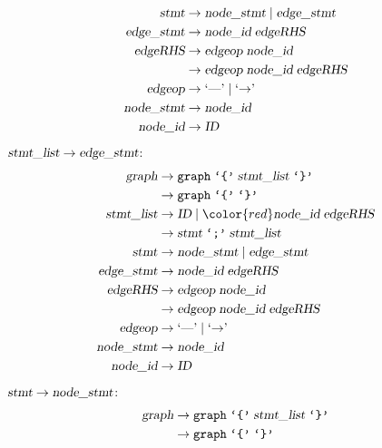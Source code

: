 \begin{loesung}
\begin{teilaufgaben}
\begin{align*}
\textsl{stmt}      &\rightarrow \textsl{node\_stmt}\; |\;
                                \textsl{edge\_stmt} \\
\textsl{edge\_stmt}&\rightarrow \textsl{node\_id}\; \textsl{edgeRHS} \\
\textsl{edgeRHS}   &\rightarrow \textsl{edgeop}\; \textsl{node\_id}\\
                   &\rightarrow \textsl{edgeop}\; \textsl{node\_id}\; \textsl{edgeRHS}\\
\textsl{edgeop}    &\rightarrow \textrm{`\text{---}'}\; |\; \textrm{`$\rightarrow$'}\; \\
\textsl{node\_stmt}&\rightarrow \textsl{node\_id} \\
\textsl{node\_id}  &\rightarrow \textsl{ID}
\end{align*}
$\textsl{stmt\_list}\to\textsl{edge\_stmt}$:
\begin{align*}
\textsl{graph}     &\rightarrow \texttt{graph}\; \texttt{`\{'}\; \textsl{stmt\_list}\; \texttt{`\}'} \\
                   &\rightarrow \texttt{graph}\; \texttt{`\{'}\; \texttt{`\}'} \\
\textsl{stmt\_list}&\rightarrow \textsl{ID}\; |\;
                                {\color{red}\textsl{node\_id}\; \textsl{edgeRHS} }\\
                   &\rightarrow \textsl{stmt}\; \texttt{`;'}\; \textsl{stmt\_list}\\
\textsl{stmt}      &\rightarrow \textsl{node\_stmt}\; |\;
                                \textsl{edge\_stmt} \\
\textsl{edge\_stmt}&\rightarrow \textsl{node\_id}\; \textsl{edgeRHS} \\
\textsl{edgeRHS}   &\rightarrow \textsl{edgeop}\; \textsl{node\_id}\\
                   &\rightarrow \textsl{edgeop}\; \textsl{node\_id}\; \textsl{edgeRHS}\\
\textsl{edgeop}    &\rightarrow \textrm{`\text{---}'}\; |\; \textrm{`$\rightarrow$'}\; \\
\textsl{node\_stmt}&\rightarrow \textsl{node\_id} \\
\textsl{node\_id}  &\rightarrow \textsl{ID}
\end{align*}
$\textsl{stmt}\to\textsl{node\_stmt}$:
\begin{align*}
\textsl{graph}     &\rightarrow \texttt{graph}\; \texttt{`\{'}\; \textsl{stmt\_list}\; \texttt{`\}'} \\
                   &\rightarrow \texttt{graph}\; \texttt{`\{'}\; \texttt{`\}'} \\

\end{align*}
\end{teilaufgaben}
\end{loesung}
